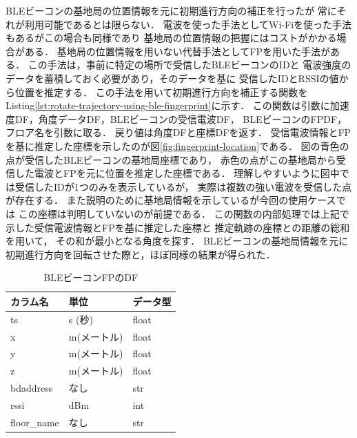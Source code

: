 BLEビーコンの基地局の位置情報を元に初期進行方向の補正を行ったが
常にそれが利用可能であるとは限らない．
電波を使った手法としてWi-Fiを使った手法もあるがこの場合も同様であり
基地局の位置情報の把握にはコストがかかる場合がある．
基地局の位置情報を用いない代替手法としてFPを用いた手法がある．
この手法は，事前に特定の場所で受信したBLEビーコンのIDと
電波強度のデータを蓄積しておく必要があり，そのデータを基に
受信したIDとRSSIの値から位置を推定する．
この手法を用いて初期進行方向を補正する関数を
Listing\ref{lst:rotate-trajectory-using-ble-fingerprint}に示す．
この関数は引数に加速度DF，角度データDF，BLEビーコンの受信電波DF，
BLEビーコンのFPDF，フロア名を引数に取る．
戻り値は角度DFと座標DFを返す．
受信電波情報とFPを基に推定した座標を示したのが図\ref{fig:fingerprint-location}である．
図の青色の点が受信したBLEビーコンの基地局座標であり，
赤色の点がこの基地局から受信した電波とFPを元に位置を推定した座標である．
理解しやすいように図中では受信したIDが1つのみを表示しているが，
実際は複数の強い電波を受信した点が存在する．
また説明のために基地局情報を示しているが今回の使用ケースでは
この座標は判明していないのが前提である．
この関数の内部処理では上記で示した受信電波情報とFPを基に推定した座標と
推定軌跡の座標との距離の総和を用いて，
その和が最小となる角度を探す．
BLEビーコンの基地局情報を元に初期進行方向を回転させた際と，ほぼ同様の結果が得られた．


\begin{table}[ht]
	\centering
	\begin{tabular}{lll}
		\toprule
		カラム名        & 単位      & データ型  \\
		\midrule
		ts          & s (秒)   & float \\
		x           & m(メートル) & float \\
		y           & m(メートル) & float \\
		z           & m(メートル) & float \\
		bdaddress   & なし      & str   \\
		rssi        & dBm     & int   \\
		floor\_name & なし      & str   \\
		\bottomrule
	\end{tabular}
	\caption{BLEビーコンFPのDF}
	\label{table:ble-beacon-fingerprint-df}
\end{table}


